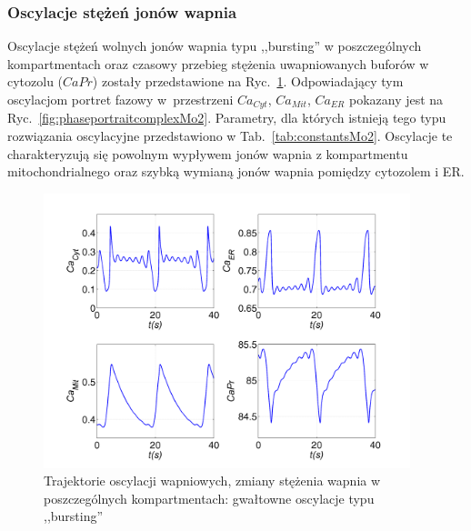 \FloatBarrier
\subsubsection*{Oscylacje stężeń jonów wapnia}

Oscylacje stężeń wolnych jonów wapnia typu ,,bursting'' w poszczególnych kompartmentach oraz czasowy przebieg stężenia uwapniowanych buforów w cytozolu ($CaPr$) zostały przedstawione na Ryc.~\ref{fig:complexoscillationsMo2}. Odpowiadający tym oscylacjom portret fazowy w~przestrzeni $Ca_{Cyt}$, $Ca_{Mit}$, $Ca_{ER}$ pokazany jest na Ryc.~\ref{fig:phaseportraitcomplexMo2}. Parametry, dla których istnieją tego typu rozwiązania oscylacyjne przedstawiono w Tab.~\ref{tab:constantsMo2}. Oscylacje te charakteryzują się powolnym wypływem jonów wapnia z kompartmentu mitochondrialnego oraz szybką wymianą jonów wapnia pomiędzy cytozolem i ER.



\begin{figure}[ht]
	\centering
	\includegraphics[width=0.95\textwidth]{rysunki/rozdzial_5/bursting_timecourseMo2}
	\caption[Oscylacje wapniowe typu ,,bursting'' w Modelu \#2]{Trajektorie oscylacji wapniowych, zmiany stężenia wapnia w poszczególnych kompartmentach: gwałtowne oscylacje typu ,,bursting''}
	\label{fig:complexoscillationsMo2}
\end{figure}


